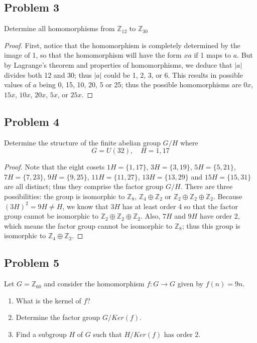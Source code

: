 \documentclass{article}
\begin{document}
\subsection*{Problem 3}
Determine all homomorphisms from $\mathbb{Z}_{12}$ to $\mathbb{Z}_{30}$
\begin{proof}
First, notice that the homomorphism is completely determined by the image of 1, so that the homomorphism will have the form $xa$ if 1 maps to $a$. But by Lagrange's theorem and properties of homomorphisms, we deduce that $|a|$ divides both 12 and 30; thus $|a|$ could be 1, 2, 3, or 6. This results in possible values of $a$ being 0, 15, 10, 20, 5 or 25; thus the possible homomorphisms are $0x$, $15x$, $10x$, $20x$, $5x$, or $25x$.
\end{proof}

\subsection*{Problem 4}
Determine the structure of the finite abelian group $G/H$ where
\[ G = U(32), \quad H = {1, 17} \]
\begin{proof} 
Note that the eight cosets $1H = \{1, 17\}$, $3H = \{3, 19\}$, $5H = \{5, 21\}$, $7H = \{7, 23\}$, $9H = \{9, 25\}$, $11H = \{11, 27\}$, $13H = \{13, 29\}$ and $15H = \{15, 31\}$ are all distinct; thus they comprise the factor group $G/H$. There are three possibilities: the group is isomorphic to $\mathbb{Z}_8$, $\mathbb{Z}_4 \oplus \mathbb{Z}_2$ or $\mathbb{Z}_2 \oplus \mathbb{Z}_2 \oplus \mathbb{Z}_2$. Because $(3H)^2 = 9H \neq H$, we know that $3H$ has at least order 4 so that the factor group cannot be isomorphic to $\mathbb{Z}_2 \oplus \mathbb{Z}_2 \oplus \mathbb{Z}_2$. Also, $7H$ and $9H$ have order 2, which means the factor group cannot be isomorphic to $\mathbb{Z}_8$; thus this group is isomorphic to $\mathbb{Z}_4 \oplus \mathbb{Z}_2$.
\end{proof}

\subsection*{Problem 5}
Let $G = \mathbb{Z}_{60}$ and consider the homomorphism $f \colon G \to G$ given
by $f(n) = 9n$.
\begin{enumerate}
    \item What is the kernel of $f$?
    \item Determine the factor group $G/Ker(f)$.
    \item Find a subgroup $H$ of $G$ such that $H/Ker(f)$ has order 2.
\end{enumerate}
\end{document}
